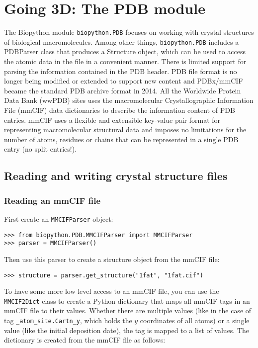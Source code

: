 \chapter{Going 3D: The PDB module}
\label{chapter:pdb}

The Biopython module \verb+biopython.PDB+ focuses on working with crystal structures of biological macromolecules. Among other things, \verb+biopython.PDB+ includes a PDBParser class that produces a Structure object, which can be used to access the atomic data in the file in a convenient manner. There is limited support for parsing the information contained in the PDB header. PDB file format is no longer being modified or extended to support new content and PDBx/mmCIF became the standard PDB archive format in 2014. All the Worldwide Protein Data Bank (wwPDB) sites uses the macromolecular Crystallographic Information File (mmCIF) data dictionaries to describe the information content of PDB entries. mmCIF uses a flexible and extensible key-value pair format for representing macromolecular structural data and imposes no limitations for the number of atoms, residues or chains that can be represented in a single PDB entry (no split entries!).


\section{Reading and writing crystal structure files}

\subsection{Reading an mmCIF file}

First create an \texttt{MMCIFParser} object:

\begin{verbatim}
>>> from biopython.PDB.MMCIFParser import MMCIFParser
>>> parser = MMCIFParser()
\end{verbatim}
Then use this parser to create a structure object from the mmCIF file:
\begin{verbatim}
>>> structure = parser.get_structure("1fat", "1fat.cif")
\end{verbatim}

To have some more low level access to an mmCIF file, you can use the \verb+MMCIF2Dict+ class to create a Python dictionary that maps all mmCIF
tags in an mmCIF file to their values. Whether there are multiple values
(like in the case of tag \verb+_atom_site.Cartn_y+, which holds
the $y$ coordinates of all atoms) or a single value (like the initial deposition date), the tag is mapped to a list of values.
The dictionary is created from the mmCIF file as follows:


